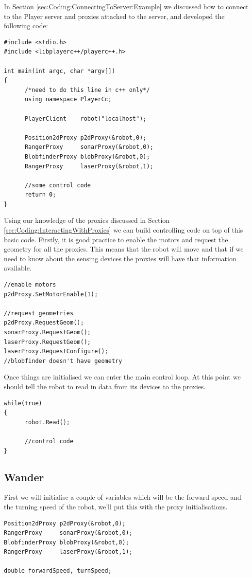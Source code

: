 \documentclass[a4paper]{report}
\newcommand{\pl}{Player\xspace}
\begin{document}
In Section \ref{sec:Coding:ConnectingToServer:Example} we discussed how to connect to the \pl server and proxies attached to the server, and developed the following code:
\begin{verbatim}
#include <stdio.h>
#include <libplayerc++/playerc++.h>

int main(int argc, char *argv[])
{
      /*need to do this line in c++ only*/
      using namespace PlayerCc;
	
      PlayerClient    robot("localhost");

      Position2dProxy p2dProxy(&robot,0);
      RangerProxy     sonarProxy(&robot,0);
      BlobfinderProxy blobProxy(&robot,0);
      RangerProxy     laserProxy(&robot,1);

      //some control code
      return 0;
}
\end{verbatim}
Using our knowledge of the proxies discussed in Section \ref{sec:Coding:InteractingWithProxies} we can build controlling code on top of this basic code. 
Firstly, it is good practice to enable the motors and request the geometry for all the proxies. This means that the robot will move and that if we need to know about the sensing devices the proxies will have that information available.
\begin{verbatim}
//enable motors
p2dProxy.SetMotorEnable(1);

//request geometries
p2dProxy.RequestGeom();
sonarProxy.RequestGeom();
laserProxy.RequestGeom();
laserProxy.RequestConfigure();
//blobfinder doesn't have geometry
\end{verbatim}

Once things are initialised we can enter the main control loop. At this point we should tell the robot to read in data from its devices to the proxies.
\begin{verbatim}
while(true)
{
      robot.Read();

      //control code
}
\end{verbatim}

\subsection{Wander}

First we will initialise a couple of variables which will be the forward
speed and the turning speed of the robot, we'll put this with the proxy
initialisations.
\begin{verbatim}
Position2dProxy p2dProxy(&robot,0);
RangerProxy     sonarProxy(&robot,0);
BlobfinderProxy blobProxy(&robot,0);
RangerProxy     laserProxy(&robot,1);

double forwardSpeed, turnSpeed;
\end{verbatim}
\end{document}
